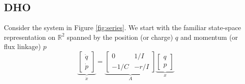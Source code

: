 \documentclass{article}
\begin{document}
\subsection{DHO}
\label{sec: DHO}
Consider the system in Figure \ref{fig:series}.
We start with the familiar state-space representation on $\mathbb{R}^{2}$ spanned by the position (or charge) $q$ and momentum (or flux linkage) $p$
\begin{equation}
\label{eq: dynAx}
    \underbrace{\begin{bmatrix}
    \dot{q}\\
    \dot{p}
    \end{bmatrix}}_{\dot{x}}=\underbrace{\begin{bmatrix}
    0 &1/I\\
    -1/C &-{r}/{I}
    \end{bmatrix}}_{A}\underbrace{
    \begin{bmatrix}
    q\\p
    \end{bmatrix}}_{x}
\end{equation} 
\end{document}
